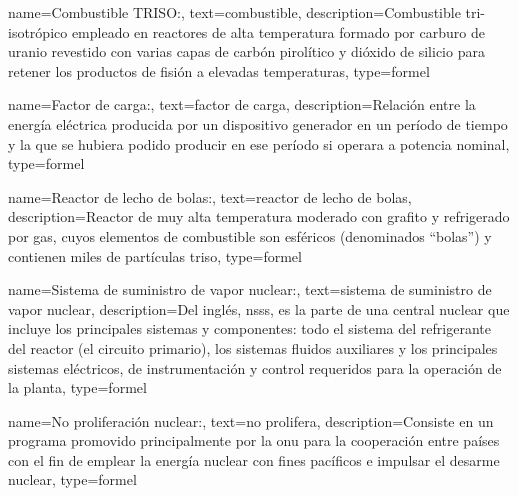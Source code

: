 {
    name=Combustible TRISO:,
    text={combustible},
    description={Combustible tri-isotrópico empleado en reactores de alta temperatura formado por carburo de uranio revestido con varias capas de carbón pirolítico y dióxido de silicio para retener los productos de fisión a elevadas temperaturas},
    type=formel
}

{
    name=Factor de carga:,
    text={factor de carga},
    description={Relación entre la energía eléctrica producida por un dispositivo generador en un período de tiempo y la que se hubiera podido producir en ese período si operara a potencia nominal},
    type=formel
}

{
    name=Reactor de lecho de bolas:,
    text={reactor de lecho de bolas},
    description={Reactor de muy alta temperatura moderado con grafito y refrigerado por gas, cuyos elementos de combustible son esféricos (denominados ``bolas'') y contienen miles de partículas \acrshort{triso}},
    type=formel
}

{
    name=Sistema de suministro de vapor nuclear:,
    text={sistema de suministro de vapor nuclear},
    description={Del inglés, \acrshort{nsss}, es la parte de una central nuclear que incluye los principales sistemas y componentes: todo el sistema del refrigerante del reactor (el circuito primario), los sistemas fluidos auxiliares y los principales sistemas eléctricos, de instrumentación y control requeridos para la operación de la planta},
    type=formel
}

{
    name=No proliferación nuclear:,
    text={no prolifera},
    description={Consiste en un programa promovido principalmente por la \acrshort{onu} para la cooperación entre países con el fin de emplear la energía nuclear con fines pacíficos e impulsar el desarme nuclear},
    type=formel
}


